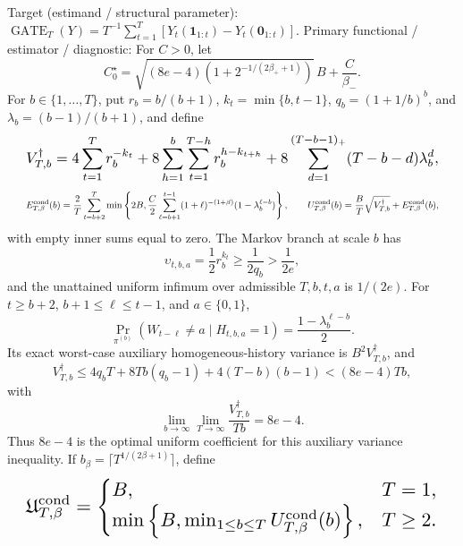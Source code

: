 \documentclass{article}
\begin{document}
Target (estimand / structural parameter): \(\operatorname{GATE}_T(Y)=T^{-1}\sum_{t=1}^T[Y_t(\mathbf1_{1:t})-Y_t(\mathbf0_{1:t})]\).
Primary functional / estimator / diagnostic: For \(C>0\), let \[C_0^\star=\sqrt{(8e-4)\left(1+2^{-1/(2\beta_++1)}\right)}\,B+\frac C{\beta_-}.\] For \(b\in\{1,\ldots,T\}\), put \(r_b=b/(b+1)\), \(k_t=\min\{b,t-1\}\), \(q_b=(1+1/b)^b\), and \(\lambda_b=(b-1)/(b+1)\), and define \[
\makebox[\linewidth][c]{\resizebox{0.98\linewidth}{!}{\leavevmode\par\noindent \makebox[\linewidth][c]{\resizebox{0.98\linewidth}{!}{\(\displaystyle \displaystyle V_{T,b}^{\dagger}=4\sum_{t=1}^T r_b^{-k_t}+8\sum_{h=1}^b\sum_{t=1}^{T-h}r_b^{h-k_{t+h}}+8\sum_{d=1}^{(T-b-1)_+}(T-b-d)\lambda_b^d,\)}}\par\noindent}}
\] \[
\makebox[\linewidth][c]{\resizebox{0.98\linewidth}{!}{\leavevmode\par\noindent \makebox[\linewidth][c]{\resizebox{0.98\linewidth}{!}{\(\displaystyle \displaystyle E_{T,\beta}^{\mathrm{cond}}(b)=\frac2T\sum_{t=b+2}^T\min\left\{2B,\frac C2\sum_{\ell=b+1}^{t-1}(1+\ell)^{-(1+\beta)}(1-\lambda_b^{\ell-b})\right\},\qquad U_{T,\beta}^{\mathrm{cond}}(b)=\frac BT\sqrt{V_{T,b}^{\dagger}}+E_{T,\beta}^{\mathrm{cond}}(b),\)}}\par\noindent}}
\] with empty inner sums equal to zero. The Markov branch at scale \(b\) has \[\upsilon_{t,b,a}=\frac12r_b^{k_t}\ge\frac{1}{2q_b}>\frac{1}{2e},\] and the unattained uniform infimum over admissible \(T,b,t,a\) is \(1/(2e)\). For \(t\ge b+2\), \(b+1\le\ell\le t-1\), and \(a\in\{0,1\}\), \[\Pr_{\pi^{(b)}}(W_{t-\ell}\ne a\mid H_{t,b,a}=1)=\frac{1-\lambda_b^{\ell-b}}2.\] Its exact worst-case auxiliary homogeneous-history variance is \(B^2V_{T,b}^{\dagger}\), and \[V_{T,b}^{\dagger}\le4q_bT+8Tb(q_b-1)+4(T-b)(b-1)< (8e-4)Tb,\] with \[\lim_{b\to\infty}\lim_{T\to\infty}\frac{V_{T,b}^{\dagger}}{Tb}=8e-4.\] Thus \(8e-4\) is the optimal uniform coefficient for this auxiliary variance inequality. If \(b_\beta=\lceil T^{1/(2\beta+1)}\rceil\), define \[
\makebox[\linewidth][c]{\resizebox{0.98\linewidth}{!}{\leavevmode\par\noindent \makebox[\linewidth][c]{\resizebox{0.98\linewidth}{!}{\(\displaystyle \displaystyle \mathfrak U_{T,\beta}^{\mathrm{cond}}=\begin{cases}B,&T=1,\\ \min\left\{B,\min_{1\le b\le T}U_{T,\beta}^{\mathrm{cond}}(b)\right\},&T\ge2.\end{cases}\)}}\par\noindent}}
\]
\end{document}
